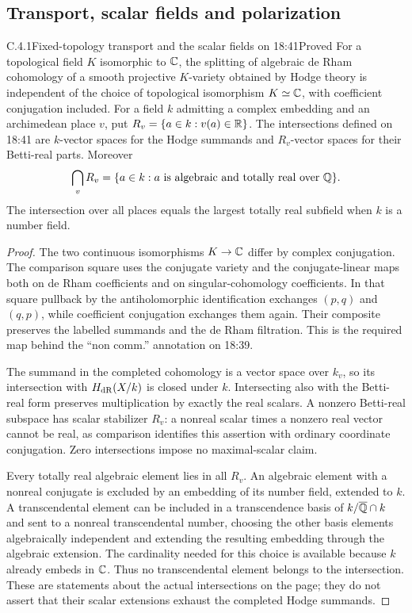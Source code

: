 \subsection{Transport, scalar fields and polarization}

\begin{result}{C.4.1}{Fixed-topology transport and the scalar fields on 18:41}{Proved}
For a topological field $K$ isomorphic to $\mathbb C$, the splitting of algebraic de Rham cohomology of a smooth projective $K$-variety obtained by Hodge theory is independent of the choice of topological isomorphism $K\simeq\mathbb C$, with coefficient conjugation included. For a field $k$ admitting a complex embedding and an archimedean place $v$, put $R_v=\{a\in k:v(a)\in\mathbb R\}$. The intersections defined on 18:41 are $k$-vector spaces for the Hodge summands and $R_v$-vector spaces for their Betti-real parts. Moreover
\[
 \bigcap_vR_v=\{a\in k:a\text{ is algebraic and totally real over }\mathbb Q\}.
\]
The intersection over all places equals the largest totally real subfield when $k$ is a number field.
\end{result}
\begin{proof}
The two continuous isomorphisms $K\to\mathbb C$ differ by complex conjugation. The comparison square uses the conjugate variety and the conjugate-linear maps both on de Rham coefficients and on singular-cohomology coefficients. In that square pullback by the antiholomorphic identification exchanges $(p,q)$ and $(q,p)$, while coefficient conjugation exchanges them again. Their composite preserves the labelled summands and the de Rham filtration. This is the required map behind the ``non comm.'' annotation on 18:39.

The summand in the completed cohomology is a vector space over $k_v$, so its intersection with $H_{\mathrm{dR}}(X/k)$ is closed under $k$. Intersecting also with the Betti-real form preserves multiplication by exactly the real scalars. A nonzero Betti-real subspace has scalar stabilizer $R_v$: a nonreal scalar times a nonzero real vector cannot be real, as comparison identifies this assertion with ordinary coordinate conjugation. Zero intersections impose no maximal-scalar claim.

Every totally real algebraic element lies in all $R_v$. An algebraic element with a nonreal conjugate is excluded by an embedding of its number field, extended to $k$. A transcendental element can be included in a transcendence basis of $k/\overline{\mathbb Q}\cap k$ and sent to a nonreal transcendental number, choosing the other basis elements algebraically independent and extending the resulting embedding through the algebraic extension. The cardinality needed for this choice is available because $k$ already embeds in $\mathbb C$. Thus no transcendental element belongs to the intersection. These are statements about the actual intersections on the page; they do not assert that their scalar extensions exhaust the completed Hodge summands.
\end{proof}

